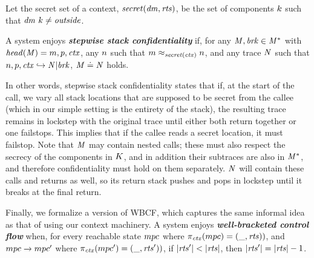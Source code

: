 \documentclass[acmsmall,review,anonymous]{acmart}\settopmatter{printfolios=true,printccs=false,printacmref=false}
\begin{document}
{
Let the secret set of a context, \(\mathit{secret}(\mathit{dm},\mathit{rts})\), be the
set of components \(k\) such that \(\mathit{dm} ~ k \not = \mathit{outside}\).

A system enjoys \textbf{\textit{stepwise stack confidentiality}} if,
for any \(\mathit{M},\mathit{brk} \in \mathit{M}^*\) with \(\mathit{head}(\mathit{M}) = m,p,\mathit{ctx}\),
any \(n\) such that \(m \approx_{\mathit{secret}(\mathit{ctx})} n\), and any trace
\(\mathit{N}\) such that \(n,p,\mathit{ctx} \hookrightarrow \mathit{N} | \mathit{brk}\),
\(\mathit{M} \doteq \mathit{N}\) holds.


In other words, stepwise stack confidentiality states that if, at the start of the call,
we vary all stack locations that are supposed to be secret from the callee
(which in our simple setting is the entirety of the stack),
the resulting trace remains in lockstep with the original trace
until either both return together or one failstops. This implies that
if the callee reads a secret location, it must failstop. %
%
Note that \(\mathit{M}\) may contain nested calls; these must also respect the secrecy
of the components in \(K\), and in addition their subtraces are also in
\(\mathit{M}^*\), and therefore confidentiality must hold on them separately. \(\mathit{N}\)
will contain these calls and returns as well, so its return stack pushes and pops
in lockstep until it breaks at the final return.

Finally, we formalize a version of WBCF, which captures the same informal idea
as that of \citet{SkorstengaardSTKJFP} using our context machinery.
A system enjoys \textit{\textbf{well-bracketed control flow}} when, for every reachable state
\(mpc\) where \(\pi_{\mathit{ctx}}(mpc) = (\mbox{\_},\mathit{rts}))\), and
\(mpc \xrightarrow{} mpc'\) where \(\pi_{\mathit{ctx}}(mpc') = (\mbox{\_},\mathit{rts}'))\),
if \(|\mathit{rts}'| < |\mathit{rts}|\), then \(|\mathit{rts}'| = |\mathit{rts}|-1\).



}
\end{document}
